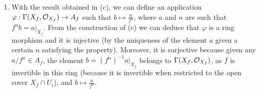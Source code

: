 \begin{sol}
\begin{enumerate}[label=\alph*)]
		\item With the result obtained in (c), we can define an application $\varphi: \Gamma(X_f, \mathcal{O}_{X_f}) \to A_f$ such that $b \mapsto \frac{a}{f^n}$, where $a$ and $n$ are such that $f^nb = a|_{X_f}$. From the construction of (c) we can deduce that $\varphi$ is a ring morphism and it is injective (by the uniqueness of the element $a$ given a certain $n$ satisfying the property). Moreover, it is surjective because given any $a/f^n \in A_f$, the element $b = (f^n)^{-1}a|_{X_f}$ belongs to $\Gamma(X_f, \mathcal{O}_{X_f})$, as $f$ is invertible in this ring (because it is invertible when restricted to the open cover $X_f \cap U_i$), and $b \mapsto \frac{a}{f^n}$.
	\end{enumerate}
\end{sol}